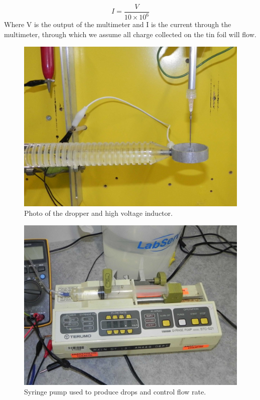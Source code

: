 \begin{equation}
I=\frac{V}{10\times10^{6}}
\end{equation}
Where V is the output of the multimeter and I is the current through
the multimeter, through which we assume all charge collected on the
tin foil will flow.

\begin{figure}
    \centering
    \includegraphics[scale=0.15]{content/appendices/chargedWaterDrops/graphics/Photo_dripperExperiment_Inductor_draft.JPG}
    \caption{Photo of the dropper and high voltage inductor.}
    \label{Photo_dripperExperiment_Inductor}
\end{figure}

\begin{figure}
    \centering
    \includegraphics[scale=0.15]{content/appendices/chargedWaterDrops/graphics/Photo_dripperExperiment_SyringePump_draft.JPG}
    \caption{\label{Photo_dripperExperiment_SyringePump}Syringe pump used to produce
drops and control flow rate.}
\end{figure}

